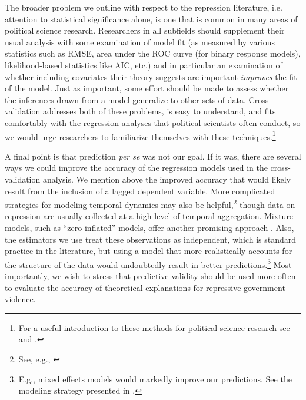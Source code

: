\documentclass[11pt]{article}
\begin{document}
The broader problem we outline with respect to the repression literature, i.e. attention to statistical significance alone, is one that is common in many areas of political science research. Researchers in all subfields should supplement their usual analysis with some examination of model fit (as measured by various statistics such as RMSE, area under the ROC curve (for binary response models), likelihood-based statistics like AIC, etc.) and in particular an examination of whether including covariates their theory suggests are important {\em improves} the fit of the model. Just as important, some effort should be made to assess whether the inferences drawn from a model generalize to other sets of data. Cross-validation addresses both of these problems, is easy to understand, and fits comfortably with the regression analyses that political scientists often conduct, so we would urge researchers to familiarize themselves with these techniques.\footnote{For a useful introduction to these methods for political science research see \citet{LeeAhlquist2011} and \citet{WardAhlquist2014}.} 

A final point is that prediction {\it per se} was not our goal. If it was, there are several ways we could improve the accuracy of the regression models used in the cross-validation analysis. We mention above the improved accuracy that would likely result from the inclusion of a lagged dependent variable. More complicated strategies for modeling temporal dynamics may also be helpful,\footnote{See, e.g., \citep{Brandtetal2011}} though data on repression are usually collected at a high level of temporal aggregation. Mixture models, such as ``zero-inflated'' models, offer another promising approach \citep[See, e.g.][]{Bagozzietal,Bagozzi2013}. Also, the estimators we use treat these observations as independent, which is standard practice in the literature, but using a model that more realistically accounts for the structure of the data would undoubtedly result in better predictions.\footnote{E.g., mixed effects models would markedly improve our predictions. See the modeling strategy presented in \citet{Wardetal2012}.} Most importantly, we wish to stress that predictive validity should be used more often to evaluate the accuracy of theoretical explanations for repressive government violence.

\newpage
\begin{singlespace}


\end{singlespace}
\end{document}
